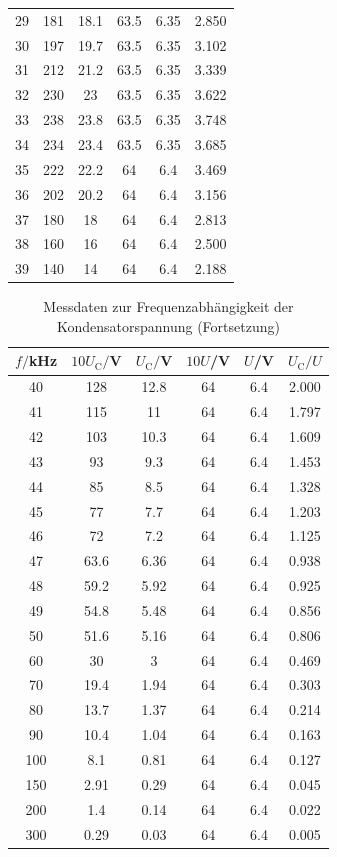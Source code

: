 \begin{table}
\begin{tabular}{c c c c c c}
 29	  & 181	   & 18.1  & 63.5 & 6.35& 2.850 \\
 30	  & 197	   & 19.7  & 63.5 & 6.35& 3.102 \\
 31	  & 212	   & 21.2  & 63.5 & 6.35& 3.339 \\
 32	  & 230	   & 23    & 63.5 & 6.35& 3.622 \\
 33	  & 238	   & 23.8  & 63.5 & 6.35& 3.748 \\
 34	  & 234	   & 23.4  & 63.5 & 6.35& 3.685 \\
 35	  & 222	   & 22.2  & 64   & 6.4 & 3.469 \\
 36	  & 202	   & 20.2  & 64   & 6.4 & 3.156 \\
 37	  & 180	   & 18    & 64   & 6.4 & 2.813 \\
 38	  & 160	   & 16    & 64   & 6.4 & 2.500 \\
 39	  & 140	   & 14    & 64   & 6.4 & 2.188 \\
\bottomrule
\end{tabular}
\end{table}

\begin{table}
\centering
\caption{Messdaten zur Frequenzabhängigkeit der Kondensatorspannung (Fortsetzung)}
\label{tab:amplitude2}
\begin{tabular}{c c c c c c}
\toprule
$f/$kHz & $10U_\mathrm{C}/$V & $U_\mathrm{C}/$V & $10U$/V & $U$/V & $U_\mathrm{C}/U$ \\
\midrule
 40	  & 128	   & 12.8  & 64   & 6.4 & 2.000 \\
 41	  & 115	   & 11    & 64   & 6.4 & 1.797 \\
 42	  & 103	   & 10.3  & 64   & 6.4 & 1.609 \\
 43	  &  93	   &  9.3  & 64   & 6.4 & 1.453 \\
 44	  &  85	   &  8.5  & 64   & 6.4 & 1.328 \\
 45	  &  77	   &  7.7  & 64   & 6.4 & 1.203 \\
 46	  &  72	   &  7.2  & 64   & 6.4 & 1.125 \\
 47	  &  63.6  &  6.36 & 64   & 6.4 & 0.938 \\
 48	  &  59.2  &  5.92 & 64   & 6.4 & 0.925 \\
 49	  &  54.8	 &  5.48 & 64   & 6.4 & 0.856 \\
 50	  &  51.6	 &  5.16 & 64   & 6.4 & 0.806 \\
 60	  &  30	   &  3    & 64   & 6.4 & 0.469 \\
 70	  &  19.4	 &  1.94 & 64   & 6.4 & 0.303 \\
 80	  &  13.7	 &  1.37 & 64   & 6.4 & 0.214 \\
 90	  &  10.4	 &  1.04 & 64   & 6.4 & 0.163 \\
100 	&   8.1	 &  0.81 & 64   & 6.4 & 0.127 \\
150	  &   2.91 &	0.29 & 64   & 6.4 & 0.045 \\
200	  &   1.4	 &  0.14 & 64   & 6.4 & 0.022 \\
300	  &   0.29 &	0.03 & 64   & 6.4 & 0.005 \\
\bottomrule
\end{tabular}
\end{table}

